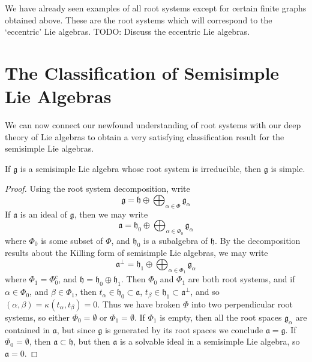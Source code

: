 We have already seen examples of all root systems except for certain finite graphs obtained above. These are the root systems which will correspond to the `eccentric' Lie algebras. TODO: Discuss the eccentric Lie algebras.

\chapter{The Classification of Semisimple Lie Algebras}

We can now connect our newfound understanding of root systems with our deep theory of Lie algebras to obtain a very satisfying classification result for the semisimple Lie algebras.

\begin{theorem}
    If $\mathfrak{g}$ is a semisimple Lie algebra whose root system is irreducible, then $\mathfrak{g}$ is simple.
\end{theorem}
\begin{proof}
    Using the root system decomposition, write
    \[ \mathfrak{g} = \mathfrak{h} \oplus \bigoplus_{\alpha \in \Phi} \mathfrak{g}_\alpha \]
    If $\mathfrak{a}$ is an ideal of $\mathfrak{g}$, then we may write
    \[ \mathfrak{a} = \mathfrak{h}_0 \oplus \bigoplus_{\alpha \in \Phi_0} \mathfrak{g}_\alpha \]
    where $\Phi_0$ is some subset of $\Phi$, and $\mathfrak{h}_0$ is a subalgebra of $\mathfrak{h}$. By the decomposition results about the Killing form of semisimple Lie algebras, we may write
    \[ \mathfrak{a}^\perp = \mathfrak{h}_1 \oplus \bigoplus_{\alpha \in \Phi_1} \mathfrak{g}_\alpha \]
    where $\Phi_1 = \Phi_0^c$, and $\mathfrak{h} = \mathfrak{h}_0 \oplus \mathfrak{h}_1$. Then $\Phi_0$ and $\Phi_1$ are both root systems, and if $\alpha \in \Phi_0$, and $\beta \in \Phi_1$, then $t_\alpha \in \mathfrak{h}_0 \subset \mathfrak{a}$, $t_\beta \in \mathfrak{h}_1 \subset \mathfrak{a}^\perp$, and so $(\alpha, \beta) = \kappa(t_\alpha, t_\beta) = 0$. Thus we have broken $\Phi$ into two perpendicular root systems, so either $\Phi_0 = \emptyset$ or $\Phi_1 = \emptyset$. If $\Phi_1$ is empty, then all the root spaces $\mathfrak{g}_\alpha$ are contained in $\mathfrak{a}$, but since $\mathfrak{g}$ is generated by its root spaces we conclude $\mathfrak{a} = \mathfrak{g}$. If $\Phi_0 = \emptyset$, then $\mathfrak{a} \subset \mathfrak{h}$, but then $\mathfrak{a}$ is a solvable ideal in a semisimple Lie algebra, so $\mathfrak{a} = 0$.
\end{proof}

